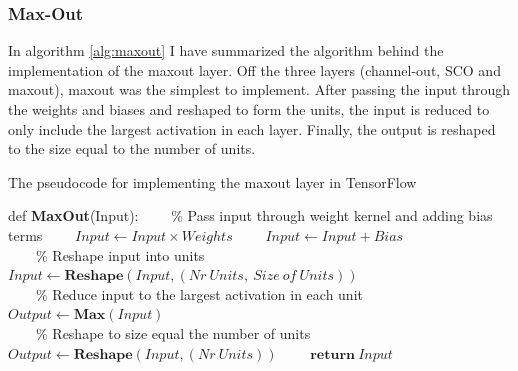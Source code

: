 \subsubsection*{Max-Out}
In algorithm \ref{alg:maxout} I have summarized the algorithm behind the implementation of the maxout layer.
Off the three layers (channel-out, \ac{SCO} and maxout), maxout was the simplest to implement. After passing 
the input through the weights and biases and reshaped to form the units, the input is reduced to only include 
the largest activation in each layer. Finally, the output is reshaped to the size equal to the number of units.
\begin{algorithm}
    \caption{The pseudocode for implementing the maxout layer in TensorFlow}\label{alg:maxout}
    \begin{algorithmic}[1]
    \State def \textbf{MaxOut}(Input): 
    \State \ \ \ \ $\%$ Pass input through weight kernel and adding bias terms
    \State \ \ \ \ $Input \gets Input \times Weights$
    \State \ \ \ \ $Input \gets Input + Bias$
    \\
    \State \ \ \ \ $\%$ Reshape input into units
    \State \ \ \ \ $Input \gets \textbf{Reshape}(Input,(Nr\ Units,\ Size \ of \ Units))$
    \\
    \State \ \ \ \ $\%$ Reduce input to the largest activation in each unit
    \State \ \ \ \ $Output \gets \textbf{Max}(Input)$
    \\
    \State \ \ \ \ $\%$ Reshape to size equal the number of units
    \State \ \ \ \ $Output \gets \textbf{Reshape}(Input,(Nr \ Units))$
    \State \ \ \ \ $\textbf{return}\ Input$
    \end{algorithmic}
\end{algorithm}